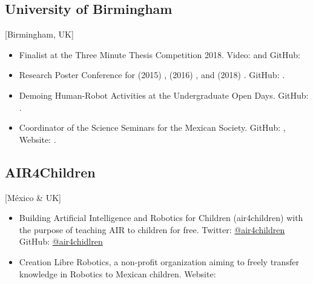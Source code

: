 \documentclass{mycv}
\begin{document}
\subsection{University of Birmingham}[Birmingham, UK]
\begin{positions}
\end{positions}
\begin{itemize}
\item  Finalist at the Three Minute Thesis Competition 2018. Video: \href{https://www.youtube.com/watch?v=07ewRYcS-0g}{\faYoutube} and 
GitHub: \href{https://github.com/mxochicale/3mt}{\faGithubAlt} 

\item Research Poster Conference for 
(2015) \href{https://github.com/mxochicale/PhD/blob/master/posters/Research_Poster_Conference_UoB/2015/poster/poster.pdf}{\faImage}, 
(2016) \href{https://github.com/mxochicale/PhD/blob/master/posters/Research_Poster_Conference_UoB/2016/poster/poster.pdf}{\faImage}, and  
(2018) \href{https://github.com/mxochicale/PhD/blob/master/posters/Research_Poster_Conference_UoB/2018/poster/main/map479-poster-uob2018.pdf}{\faImage}.
GitHub: \href{https://github.com/mxochicale/PhD/tree/master/posters/Research_Poster_Conference_UoB}{\faGithubAlt}.

\item Demoing Human-Robot Activities at the Undergraduate Open Days. GitHub: \href{https://github.com/mxochicale/opendayuob-hridemo}{\faGithubAlt}. 

\item Coordinator of the Science Seminars for the Mexican Society.  GitHub: \href{https://github.com/MexicanSocietyUoB}{\faGithubAlt}, Website: \href{https://mexicansocietyuob.github.io/seminars/}{\faExternalLink}. 

\end{itemize}


\subsection{AIR4Children}[M\'exico \& UK]
\begin{itemize}

\item Building Artificial Intelligence and Robotics for Children (air4children) with the purpose of teaching AIR to children for free. 
Twitter: \href{https://twitter.com/air4children}{\faTwitter @air4children} 
GitHub: \href{https://github.com/air4children}{\faGithubAlt @air4chidlren} 

\item Creation Libre Robotics, a non-profit organization aiming to freely transfer knowledge in Robotics to Mexican children.  Website: \href{https://sites.google.com/site/LibreRobotics/}{\faExternalLink}  

\end{itemize}
\end{document}
